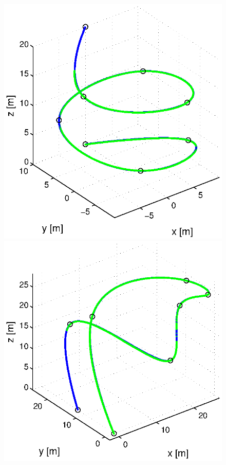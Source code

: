 \begin{figure}[h]
\begin{minipage}[t]{0.32\textwidth}
    \includegraphics[width = \textwidth]{trackings_wc/figure_3D_helix_SplineDegree3_purePursuit_Disturbance_0}
  \end{minipage}
  \hfill
  \begin{minipage}[t]{0.32\textwidth}
    \includegraphics[width = \textwidth]{trackings_wc/figure_3D_agile_SplineDegree3_purePursuit_Disturbance_0}

\end{minipage}
\end{figure}
